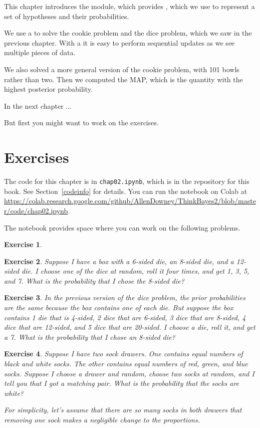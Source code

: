 \documentclass[12pt]{book}
\theoremstyle{exercise}
\newtheorem{exercise}{Exercise}[chapter]
\begin{document}
This chapter introduces the  module, which provides , which we use to represent a set of hypotheses and their probabilities.

We use a  to solve the cookie problem and the dice problem, which we saw in the previous chapter.
With a  it is easy to perform sequential updates as we see multiple pieces of data.

We also solved a more general version of the cookie problem, with 101 bowls rather than two.
Then we computed the MAP, which is the quantity with the highest posterior probability.

In the next chapter ...

But first you might want to work on the exercises.


\section{Exercises}

The code for this chapter is in {\tt chap02.ipynb}, which is in the repository for this book.  See Section~\ref{codeinfo} for details.
You can run the notebook on Colab at \url{https://colab.research.google.com/github/AllenDowney/ThinkBayes2/blob/master/code/chap02.ipynb}.

The notebook provides space where you can work on the following problems.


\begin{exercise}
\end{exercise}


\begin{exercise}
Suppose I have a box with a 6-sided die, an 8-sided die, and a 12-sided die.
I choose one of the dice at random, roll it four times, and get 1, 3, 5, and 7.
What is the probability that I chose the 8-sided die?
\end{exercise}


\begin{exercise}
In the previous version of the dice problem, the prior probabilities are the same because the box contains one of each die.
But suppose the box contains 1 die that is 4-sided, 2 dice that are 6-sided, 3 dice that are 8-sided, 4 dice that are 12-sided, and 5 dice that are 20-sided.
I choose a die, roll it, and get a 7.  What is the probability that I chose an 8-sided die?
\end{exercise}


\begin{exercise}
Suppose I have two sock drawers.  
One contains equal numbers of black and white socks.  
The other contains equal numbers of red, green, and blue socks.
Suppose I choose a drawer and random, choose two socks at random, and I tell you that I got a matching pair.
What is the probability that the socks are white?

For simplicity, let's assume that there are so many socks in both drawers that removing one sock makes a negligible change to the proportions.
\end{exercise}
\end{document}
